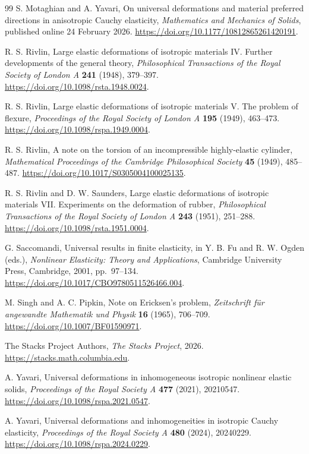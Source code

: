 \documentclass[11pt,a4paper]{article}
\numberwithin{equation}{section}
\theoremstyle{plain}
\theoremstyle{definition}
\theoremstyle{remark}
\begin{document}
\begin{thebibliography}{99}
S. Motaghian and A. Yavari,
On universal deformations and material preferred directions in anisotropic
Cauchy elasticity,
\emph{Mathematics and Mechanics of Solids}, published online 24 February 2026.
\url{https://doi.org/10.1177/10812865261420191}.

R. S. Rivlin,
Large elastic deformations of isotropic materials IV.
Further developments of the general theory,
\emph{Philosophical Transactions of the Royal Society of London A}
\textbf{241} (1948), 379--397.
\url{https://doi.org/10.1098/rsta.1948.0024}.

R. S. Rivlin,
Large elastic deformations of isotropic materials V. The problem of flexure,
\emph{Proceedings of the Royal Society of London A}
\textbf{195} (1949), 463--473.
\url{https://doi.org/10.1098/rspa.1949.0004}.

R. S. Rivlin,
A note on the torsion of an incompressible highly-elastic cylinder,
\emph{Mathematical Proceedings of the Cambridge Philosophical Society}
\textbf{45} (1949), 485--487.
\url{https://doi.org/10.1017/S0305004100025135}.

R. S. Rivlin and D. W. Saunders,
Large elastic deformations of isotropic materials VII.
Experiments on the deformation of rubber,
\emph{Philosophical Transactions of the Royal Society of London A}
\textbf{243} (1951), 251--288.
\url{https://doi.org/10.1098/rsta.1951.0004}.

G. Saccomandi, Universal results in finite elasticity,
in Y. B. Fu and R. W. Ogden (eds.),
\emph{Nonlinear Elasticity: Theory and Applications},
Cambridge University Press, Cambridge, 2001, pp.~97--134.
\url{https://doi.org/10.1017/CBO9780511526466.004}.

M. Singh and A. C. Pipkin, Note on Ericksen's problem,
\emph{Zeitschrift f\"ur angewandte Mathematik und Physik} \textbf{16}
(1965), 706--709.
\url{https://doi.org/10.1007/BF01590971}.

The Stacks Project Authors, \emph{The Stacks Project}, 2026.
\url{https://stacks.math.columbia.edu}.

A. Yavari,
Universal deformations in inhomogeneous isotropic nonlinear elastic solids,
\emph{Proceedings of the Royal Society A} \textbf{477} (2021), 20210547.
\url{https://doi.org/10.1098/rspa.2021.0547}.

A. Yavari,
Universal deformations and inhomogeneities in isotropic Cauchy elasticity,
\emph{Proceedings of the Royal Society A} \textbf{480} (2024), 20240229.
\url{https://doi.org/10.1098/rspa.2024.0229}.


\end{thebibliography}
\end{document}
